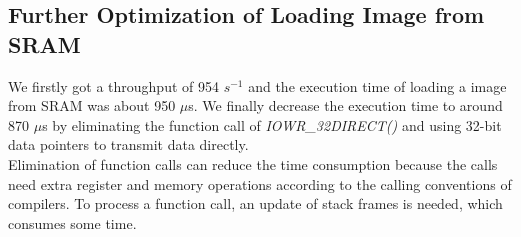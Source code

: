 \documentclass[conference]{IEEEtran}
\begin{document}
\subsection{Further Optimization of Loading Image from SRAM}
We firstly got a throughput of 954 $s^{-1}$ and the execution time of loading a image from SRAM was about 950 $\mu$s. We finally decrease the execution time to around 870 $\mu$s by eliminating the function call of \emph{IOWR\_32DIRECT()} and using 32-bit data pointers to transmit data directly.\\
\indent
Elimination of function calls can reduce the time consumption because the calls need extra register and memory operations according to the calling conventions of compilers. To process a function call, an update of stack frames is needed, which consumes some time\cite{appel2004modern}.
%
%

\end{document}
